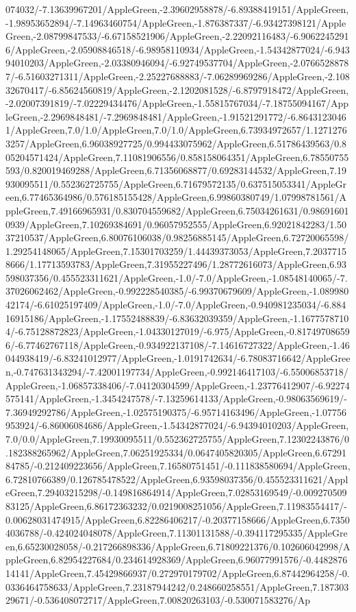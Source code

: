 {\begin{tikzternal}
074032/-7.13639967201/AppleGreen,-2.39602958878/-6.89388419151/AppleGreen,-1.98953652894/-7.14963460754/AppleGreen,-1.876387337/-6.93427398121/AppleGreen,-2.08799847533/-6.67158521906/AppleGreen,-2.22092116483/-6.90622452916/AppleGreen,-2.05908846518/-6.98958110934/AppleGreen,-1.54342877024/-6.94394010203/AppleGreen,-2.03380946094/-6.92749537704/AppleGreen,-2.07665288787/-6.51603271311/AppleGreen,-2.25227688883/-7.06289969286/AppleGreen,-2.10832670417/-6.85624560819/AppleGreen,-2.1202081528/-6.8797918472/AppleGreen,-2.02007391819/-7.02229434476/AppleGreen,-1.55815767034/-7.18755094167/AppleGreen,-2.2969848481/-7.2969848481/AppleGreen,-1.91521291772/-6.86431230461/AppleGreen,7.0/1.0/AppleGreen,7.0/1.0/AppleGreen,6.73934972657/1.12712763257/AppleGreen,6.96038927725/0.994433075962/AppleGreen,6.51786439563/0.805204571424/AppleGreen,7.11081906556/0.858158064351/AppleGreen,6.78550755593/0.820019469288/AppleGreen,6.71356068877/0.69283144532/AppleGreen,7.19930095511/0.552362725755/AppleGreen,6.71679572135/0.637515053341/AppleGreen,6.77465364986/0.576185155428/AppleGreen,6.99860380749/1.07998781561/AppleGreen,7.49166965931/0.830704559682/AppleGreen,6.75034261631/0.986916010939/AppleGreen,7.10269384691/0.96057952555/AppleGreen,6.92021842283/1.5037210537/AppleGreen,6.80076106038/0.98256885145/AppleGreen,6.72720065598/1.29254148065/AppleGreen,7.15301703259/1.44439373053/AppleGreen,7.20377158666/1.17713593783/AppleGreen,7.31955227496/1.28772616073/AppleGreen,6.93598037356/0.455523311621/AppleGreen,-1.0/-7.0/AppleGreen,-1.08548140065/-7.37026062462/AppleGreen,-0.992228540385/-6.99370679609/AppleGreen,-1.08998042174/-6.61025197409/AppleGreen,-1.0/-7.0/AppleGreen,-0.940981235034/-6.88416915186/AppleGreen,-1.17552488839/-6.83632039359/AppleGreen,-1.16775787104/-6.75128872823/AppleGreen,-1.04330127019/-6.975/AppleGreen,-0.817497086596/-6.77462767118/AppleGreen,-0.934922137108/-7.14616727322/AppleGreen,-1.46044938419/-6.83241012977/AppleGreen,-1.0191742634/-6.78083716642/AppleGreen,-0.747631343294/-7.42001197734/AppleGreen,-0.992146417103/-6.55006853718/AppleGreen,-1.06857338406/-7.04120304599/AppleGreen,-1.23776412907/-6.92274575141/AppleGreen,-1.3454247578/-7.13259614133/AppleGreen,-0.98063569619/-7.36949292786/AppleGreen,-1.02575190375/-6.95714163496/AppleGreen,-1.07756953924/-6.86006084686/AppleGreen,-1.54342877024/-6.94394010203/AppleGreen,7.0/0.0/AppleGreen,7.19930095511/0.552362725755/AppleGreen,7.12302243876/0.182388265962/AppleGreen,7.06251925334/0.0647405820305/AppleGreen,6.6729184785/-0.212409223656/AppleGreen,7.16580751451/-0.111838580694/AppleGreen,6.72810766389/0.126785478522/AppleGreen,6.93598037356/0.455523311621/AppleGreen,7.29403215298/-0.149816864914/AppleGreen,7.02853169549/-0.00927050983125/AppleGreen,6.86172363232/0.0219008251056/AppleGreen,7.11983554417/-0.00628031474915/AppleGreen,6.82286406217/-0.20377158666/AppleGreen,6.73504036788/-0.424024048078/AppleGreen,7.11301131588/-0.394117295335/AppleGreen,6.65230028058/-0.217266898336/AppleGreen,6.71809221376/0.102606042998/AppleGreen,6.82954227684/0.234614928369/AppleGreen,6.96077991576/-0.448287614141/AppleGreen,7.45429866937/0.272970179702/AppleGreen,6.87442964258/-0.0336464758633/AppleGreen,7.23187944242/0.248660258551/AppleGreen,7.18730329671/-0.536408072717/AppleGreen,7.00820263103/-0.530071583276/Ap
\end{tikzternal}}
